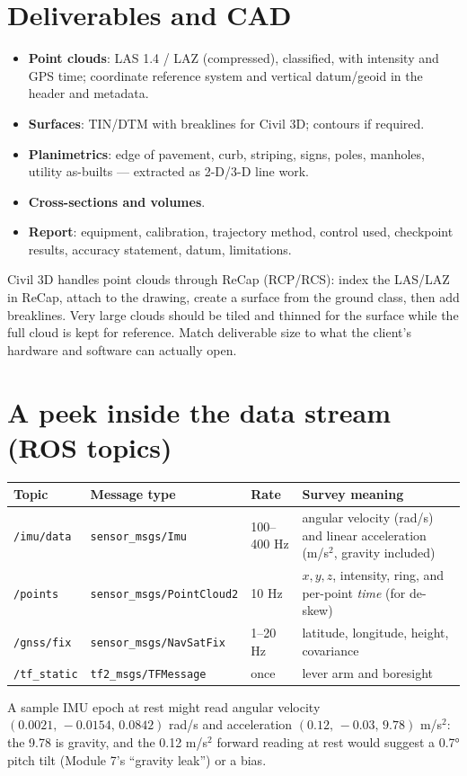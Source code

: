 \section{Deliverables and CAD}
\begin{itemize}
\item \textbf{Point clouds}: LAS 1.4 / LAZ (compressed), classified, with intensity and GPS time; coordinate reference system and vertical datum/geoid in the header and metadata.
\item \textbf{Surfaces}: TIN/DTM with breaklines for Civil 3D; contours if required.
\item \textbf{Planimetrics}: edge of pavement, curb, striping, signs, poles, manholes, utility as-builts --- extracted as 2-D/3-D line work.
\item \textbf{Cross-sections and volumes}.
\item \textbf{Report}: equipment, calibration, trajectory method, control used, checkpoint results, accuracy statement, datum, limitations.
\end{itemize}

\begin{tip}
Civil 3D handles point clouds through ReCap (RCP/RCS): index the LAS/LAZ in ReCap, attach to the drawing, create a surface from the ground class, then add breaklines. Very large clouds should be tiled and thinned for the surface while the full cloud is kept for reference. Match deliverable size to what the client's hardware and software can actually open.
\end{tip}

\section{A peek inside the data stream (ROS topics)}
\begin{center}\small
\begin{tabularx}{\linewidth}{lll X}\toprule
\textbf{Topic} & \textbf{Message type} & \textbf{Rate} & \textbf{Survey meaning}\\\midrule
\texttt{/imu/data} & \texttt{sensor\_msgs/Imu} & 100--400 Hz & angular velocity (rad/s) and linear acceleration (m/s$^2$, gravity included)\\
\texttt{/points} & \texttt{sensor\_msgs/PointCloud2} & 10 Hz & $x,y,z$, intensity, ring, and per-point \emph{time} (for de-skew)\\
\texttt{/gnss/fix} & \texttt{sensor\_msgs/NavSatFix} & 1--20 Hz & latitude, longitude, height, covariance\\
\texttt{/tf\_static} & \texttt{tf2\_msgs/TFMessage} & once & lever arm and boresight\\\bottomrule
\end{tabularx}\end{center}
A sample IMU epoch at rest might read angular velocity $(0.0021,\,-0.0154,\,0.0842)$ rad/s and acceleration $(0.12,\,-0.03,\,9.78)$ m/s$^2$: the 9.78 is gravity, and the 0.12 m/s$^2$ forward reading at rest would suggest a 0.7° pitch tilt (Module 7's ``gravity leak'') or a bias.

